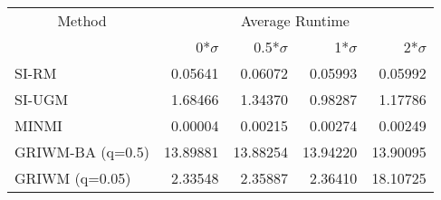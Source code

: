 
\begin{tabular}{lrrrr}
\toprule
\multicolumn{1}{c}{Method} & \multicolumn{4}{c}{Average Runtime} \\
 & 0*$\sigma$ & 0.5*$\sigma$ & 1*$\sigma$ & 2*$\sigma$\\
\midrule
SI-RM & 0.05641 & 0.06072 & 0.05993 & 0.05992\\
SI-UGM & 1.68466 & 1.34370 & 0.98287 & 1.17786\\
MINMI & 0.00004 & 0.00215 & 0.00274 & 0.00249\\
GRIWM-BA (q=0.5) & 13.89881 & 13.88254 & 13.94220 & 13.90095\\
GRIWM (q=0.05) & 2.33548 & 2.35887 & 2.36410 & 18.10725\\
\bottomrule
\end{tabular}
